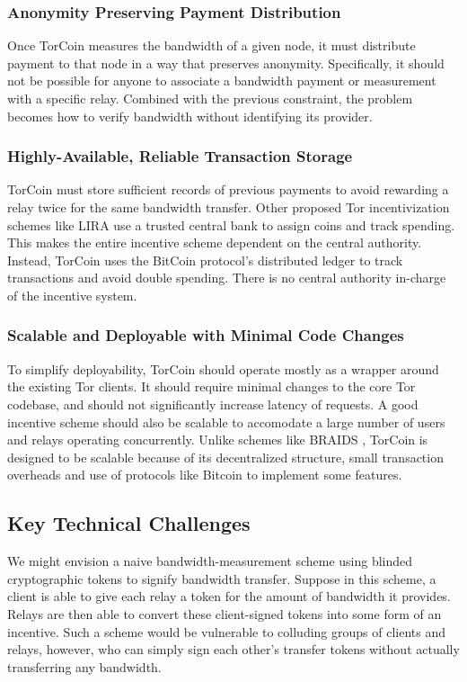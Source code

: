 \subsubsection{Anonymity Preserving Payment Distribution} Once TorCoin
measures the bandwidth of a given node, it must distribute payment to that
node in a way that preserves anonymity. Specifically, it should not be
possible for anyone to associate a bandwidth payment or measurement with a
specific relay. Combined with the previous constraint, the problem becomes how
to verify bandwidth without identifying its provider.

\subsubsection{Highly-Available, Reliable Transaction Storage} TorCoin must
store sufficient records of previous payments to avoid rewarding a relay twice
for the same bandwidth transfer. Other proposed Tor incentivization schemes
like LIRA\cite{jansen2013lira} use a trusted central bank to assign coins and
track spending. This makes the entire incentive scheme dependent on the
central authority. Instead, TorCoin uses the BitCoin protocol's distributed
ledger to track transactions and avoid double spending\cite{karame2012two}.
There is no central authority in-charge of the incentive system.

\subsubsection{Scalable and Deployable with Minimal Code Changes} To simplify
deployability, TorCoin should operate mostly as a wrapper around the existing
Tor clients. It should require minimal changes to the core Tor codebase, and
should not significantly increase latency of requests. A good incentive scheme
should also be scalable to accomodate a large number of users and relays
operating concurrently. Unlike schemes like BRAIDS \cite{ccs10-braids},
TorCoin is designed to be scalable because of its decentralized structure,
small transaction overheads and use of protocols like Bitcoin to
implement some features.

\subsection{Key Technical Challenges}

We might envision a naive bandwidth-measurement
scheme using blinded cryptographic tokens to signify bandwidth
transfer. Suppose in this scheme, a client is able to give each relay a token
for the amount of bandwidth it provides. Relays are then able to convert these
client-signed tokens into some form of an incentive. 
Such a scheme would be vulnerable
to colluding groups of clients and relays, however,
who can simply sign each other's
transfer tokens without actually transferring any bandwidth.

